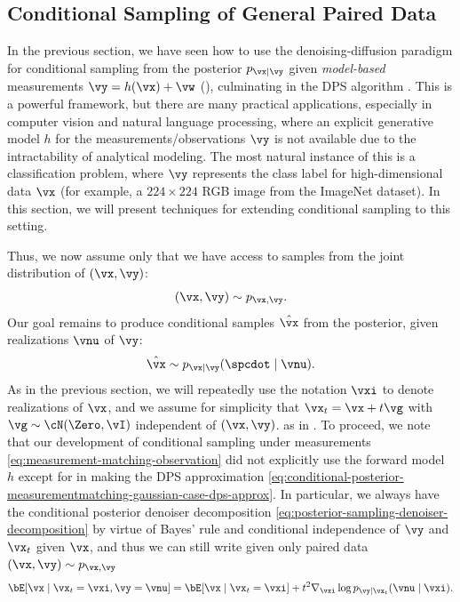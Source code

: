 \documentclass[../../book-main.tex]{subfiles}
\begin{document}

\subsection{Conditional Sampling of General Paired Data}\label{sub:cfg}

In the previous section, we have seen how to use the denoising-diffusion
paradigm for conditional sampling from the posterior $p_{\vx \mid \vy}$ given
\textit{model-based} measurements $\vy = h(\vx) + \vw$
(), culminating in the
DPS algorithm . This is a powerful
framework, but there are many practical applications, especially in computer
vision and natural language processing, where an explicit generative model $h$
for the measurements/observations $\vy$ is not available due to the
intractability of analytical modeling. The most natural instance of this is
a classification problem, where $\vy$ represents the class label for
high-dimensional data $\vx$ (for example, a $224 \times 224$ RGB image from the
ImageNet dataset). In this section, we will present techniques for extending
conditional sampling to this setting.

Thus, we now assume only that we have access to samples from the joint
distribution of $(\vx, \vy)$:
\begin{equation}
  (\vx, \vy) \sim p_{\vx, \vy}.
\end{equation}
Our goal remains to produce conditional samples $\hat{\vx}$ from the posterior,
given realizations $\vnu$ of $\vy$:
\begin{equation}
  \hat{\vx} \sim p_{\vx \mid \vy}(\spcdot \mid \vnu).
\end{equation}
As in the previous section, we will repeatedly use the notation $\vxi$ to denote
realizations of $\vx$, and we assume for simplicity that $\vx_t = \vx + t \vg$
with $\vg \sim \cN(\Zero, \vI)$ independent of $(\vx, \vy)$.
as in .
To proceed, we note that our development of conditional sampling under
measurements \eqref{eq:measurement-matching-observation} did not explicitly use
the forward model $h$ except for in making the DPS approximation
\eqref{eq:conditional-posterior-measurementmatching-gaussian-case-dps-approx}.
In particular, we always have the conditional posterior denoiser decomposition
\eqref{eq:posterior-sampling-denoiser-decomposition} by virtue of Bayes' rule
and conditional independence of $\vy$ and $\vx_t$ given $\vx$, and thus we can
still write given only paired data $(\vx, \vy) \sim p_{\vx, \vy}$
\begin{equation*}
  \bE[ \vx \mid \vx_t=\vxi, \vy=\vnu]
  =
  \bE[\vx \mid \vx_t=\vxi] + t^2 \nabla_{\vxi}\log p_{\vy \mid \vx_t}(\vnu\mid
  \vxi).
\end{equation*}
\end{document}
